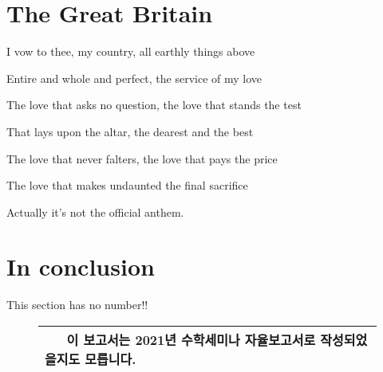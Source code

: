 \section{The Great Britain}
I vow to thee, my country, all earthly things above

Entire and whole and perfect, the service of my love

The love that asks no question, the love that stands the test

That lays upon the altar, the dearest and the best

The love that never falters, the love that pays the price

The love that makes undaunted the final sacrifice

\begin{remark}
    Actually it's not the official anthem.
\end{remark}

\section*{In conclusion}
This section has no number!!


\vspace{4.5cm}
\begin{figure}[H]
\begin{table}[H]
\begin{center}
\begin{tabular}{l}
\hline
\textbf{~~~이 보고서는 2021년 수학세미나 자율보고서로 작성되었을지도 모릅니다.~~~}\\
\hline
\end{tabular}
\end{center}
\end{table}
\end{figure}